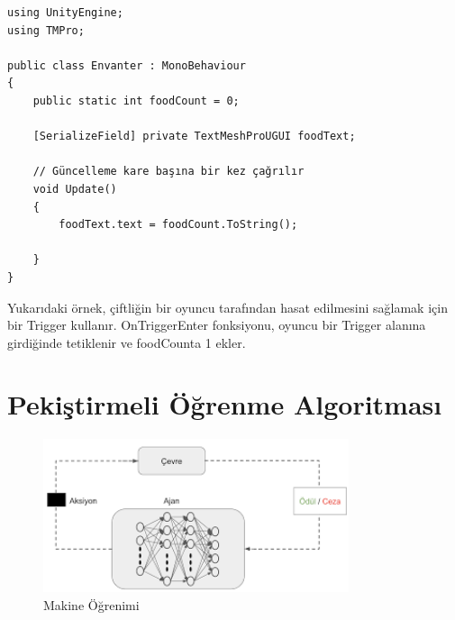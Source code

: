 \documentclass{article}
\begin{document}
\begin{verbatim}
using UnityEngine;
using TMPro;

public class Envanter : MonoBehaviour
{ 
    public static int foodCount = 0;
    
    [SerializeField] private TextMeshProUGUI foodText;

    // Güncelleme kare başına bir kez çağrılır
    void Update()
    {
        foodText.text = foodCount.ToString();

    }
}
\end{verbatim}

Yukarıdaki örnek, çiftliğin bir oyuncu tarafından hasat edilmesini sağlamak için bir Trigger kullanır. OnTriggerEnter fonksiyonu, oyuncu bir Trigger alanına girdiğinde tetiklenir ve foodCounta 1 ekler.
\clearpage

\section{Pekiştirmeli Öğrenme Algoritması}
\begin{figure}[h]
    \centering
    \includegraphics[width=0.8\textwidth]{ajantablosu.png}
    \caption{Makine Öğrenimi \cite{mnih013playing}} 
    \label{fig:resim13}
\end{figure}
\end{document}
